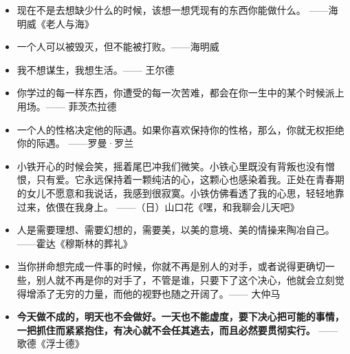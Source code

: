 \documentclass[UTF8,a4paper,8pt]{ctexart}
\begin{document}
\begin{itemize}
 	\item 现在不是去想缺少什么的时候，该想一想凭现有的东西你能做什么。	——海明威《老人与海》
 	
 	\item 一个人可以被毁灭，但不能被打败。——海明威
 	
 	\item 我不想谋生，我想生活。—— 王尔德
 	
 	\item 你学过的每一样东西，你遭受的每一次苦难，都会在你一生中的某个时候派上用场。—— 菲茨杰拉德
 	
 	\item 一个人的性格决定他的际遇。如果你喜欢保持你的性格，那么，你就无权拒绝你的际遇。	——罗曼·罗兰
 	
 	\item 小铁开心的时候会笑，摇着尾巴冲我们微笑。小铁心里既没有背叛也没有憎恨，只有爱。它永远保持着一颗纯洁的心，这颗心也感染着我。正处在青春期的女儿不愿意和我说话，我感到很寂寞。小铁仿佛看透了我的心思，轻轻地靠过来，依偎在我身上。	——（日）山口花《嘿，和我聊会儿天吧》
 	
 	\item 人是需要理想、需要幻想的，需要美，以美的意境、美的情操来陶冶自己。	——霍达《穆斯林的葬礼》
 	
 	\item 当你拼命想完成一件事的时候，你就不再是别人的对手，或者说得更确切一些，别人就不再是你的对手了，不管是谁，只要下了这个决心，他就会立刻觉得增添了无穷的力量，而他的视野也随之开阔了。—— 大仲马
 	
 	\item \textbf{今天做不成的，明天也不会做好。一天也不能虚度，要下决心把可能的事情，一把抓住而紧紧抱住，有决心就不会任其逃去，而且必然要贯彻实行。}	——歌德《浮士德》
 \end{itemize}
\end{document}
